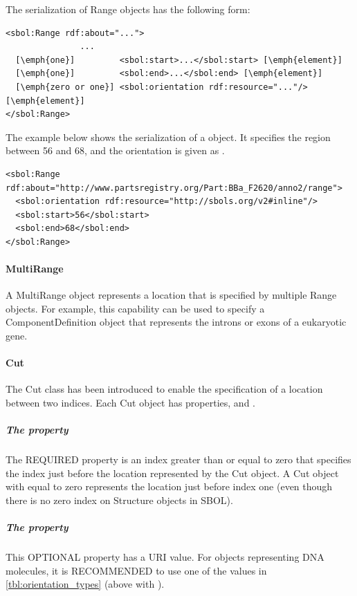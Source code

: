 The serialization of Range objects has the following form:
\begin{lstlisting}
<sbol:Range rdf:about="...">
               ...   
  [\emph{one}]         <sbol:start>...</sbol:start> [\emph{element}] 
  [\emph{one}]         <sbol:end>...</sbol:end> [\emph{element}] 
  [\emph{zero or one}] <sbol:orientation rdf:resource="..."/> [\emph{element}] 
</sbol:Range>
\end{lstlisting}

The example below shows the serialization of a  object. It specifies the region between 56 and 68, and the orientation is given as .
\begin{lstlisting}
<sbol:Range rdf:about="http://www.partsregistry.org/Part:BBa_F2620/anno2/range">
  <sbol:orientation rdf:resource="http://sbols.org/v2#inline"/>
  <sbol:start>56</sbol:start>
  <sbol:end>68</sbol:end>
</sbol:Range>
\end{lstlisting}

\paragraph{MultiRange}
\label{sec:MultiRange}
A MultiRange object represents a location that is specified by multiple Range objects. For example, this capability can be used to specify a ComponentDefinition object that represents the introns or exons of a eukaryotic gene.

\paragraph{Cut}
\label{sec:Cut}
The Cut class has been introduced to enable the specification of a location between two indices. 
Each Cut object has properties,  and .

\subparagraph{The  property}

The REQUIRED  property is an index greater than or equal to zero that specifies the index just before the location represented by the Cut object. 
A Cut object with  equal to zero represents the location just before index one (even though there is no zero index on Structure objects in SBOL). 

\subparagraph{The  property}
This OPTIONAL property has a URI value. For  objects representing DNA molecules, it is RECOMMENDED to use one of the values in \ref{tbl:orientation_types} (above with ).


